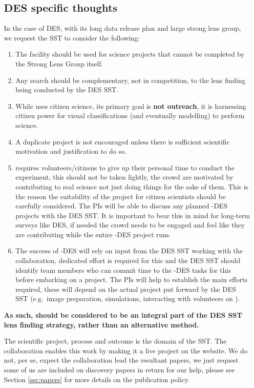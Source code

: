 \documentclass[a4paper,twocolumn]{article}
\begin{document}
\subsection{DES specific thoughts}
In the case of DES, with its long data release plan and large strong lens group, we request the SST to consider the following:
\begin{enumerate}
\item The \SW facility should be used for science projects that cannot be completed by the Strong Lens Group itself. 
\item Any \SW search should be complementary, not in competition, to the lens finding being conducted by the DES SST.
\item While \SW uses citizen science, its primary goal is \textbf{not outreach}, it is harnessing citizen power for visual classifications (and eventually modelling) to perform science.
\item A duplicate project is not encouraged unless there is sufficient scientific motivation and justification to do so.
\item \SW requires volunteers/citizens to give up their personal time to conduct the experiment, this should not be taken lightly, the crowd are motivated by contributing to real science not just doing things for the sake of them. This is the reason the suitability of the project for citizen scientists should be carefully considered. The \SW PIs will be able to discuss any planned \SW-DES projects with the DES SST. It is important to bear this in mind for long-term surveys like DES, if needed the crowd needs to be engaged and feel like they are contributing while the entire \SW-DES project runs.
\item The success of \SW-DES will rely on input from the DES SST working with the \SW collaboration, dedicated effort is required for this and the DES SST should identify team members who can commit time to the \SW-DES tasks for this before embarking on a project. The \SW PIs will help to establish the main efforts required, these will depend on the actual project put forward by the DES SST (e.g.\ image preparation, simulations, interacting with volunteers on \Talk).
\end{enumerate}

\textbf{As such, \SW should be considered to be an integral part of the DES SST lens finding strategy, rather than an alternative method.}

The scientific project, process and outcome is the domain of the SST. The \SW collaboration enables this work by making it a live project on the website. We do not, per se, expect the \SW collaboration lead the resultant papers, we just request some of us are included on discovery papers in return for our help, please see Section \ref{sec:papers} for more details on the publication policy.
\end{document}
